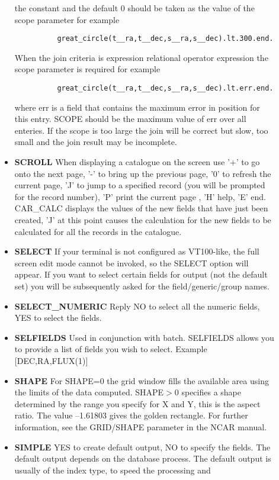 \begin{description}
\begin{itemize}
the constant and the default 0 should be taken as the value of the 
scope parameter for example
\begin{verbatim}
          great_circle(t__ra,t__dec,s__ra,s__dec).lt.300.end. 
\end{verbatim}
 When the join criteria is expression relational 
operator expression the scope parameter is required for example
\begin{verbatim}
          great_circle(t__ra,t__dec,s__ra,s__dec).lt.err.end. 
\end{verbatim}
where err is a field that contains the maximum error in position
for this entry. SCOPE should be the maximum value of err over all
enteries. If the scope is too large the join will be correct but
slow, too small and the join result may be incomplete.
\item{\bf SCROLL} When displaying a catalogue on the screen use '+' to go onto
the next page, '-' to bring up the previous page, '0' to refresh the current
page, 'J' to jump to a specified record (you will be prompted for the record 
number), 'P' print the current page , 'H' help, 'E' end. CAR\_CALC displays the 
values of the new fields that have just been created, 'J' at this point causes
the calculation for the new fields to be calculated for all the records in the
catalogue.
\item{\bf SELECT} If your terminal is not configured as VT100-like, the full
screen edit mode cannot be invoked, so the SELECT option will appear.
If you want to select certain fields for output (not the default set) you will
be subsequently asked for the field/generic/group names.
\item {\bf SELECT\_NUMERIC} Reply NO to select all the numeric fields, YES
to select the fields.
\item{\bf SELFIELDS} Used in conjunction with batch. SELFIELDS allows you to 
provide a list of fields you wish to select. Example [DEC,RA,FLUX(1)]
\item{\bf SHAPE} For SHAPE=0 the grid window fills the available area using 
the limits of the data computed. 
SHAPE$>$0 specifies a shape determined by the range you specify for X and Y,
this is the aspect ratio.  
The value --1.61803 gives the golden rectangle.
For further information, see the GRID/SHAPE parameter in the NCAR manual. 
\item{\bf SIMPLE} YES to create default output, NO to specify the fields.
The default output depends on the database process.
The default output is usually of the index type, to speed the processing and 

\end{itemize}
\end{description}
